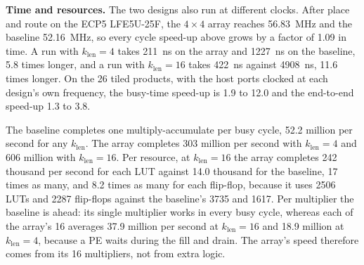 \textbf{Time and resources.} The two designs also run at different clocks. After place and route on the ECP5 LFE5U-25F, the $4 \times 4$ array reaches 56.83~MHz and the baseline 52.16~MHz, so every cycle speed-up above grows by a factor of 1.09 in time. A run with $k_{\mathrm{len}} = 4$ takes 211~ns on the array and 1227~ns on the baseline, 5.8 times longer, and a run with $k_{\mathrm{len}} = 16$ takes 422~ns against 4908~ns, 11.6 times longer. On the 26 tiled products, with the host ports clocked at each design's own frequency, the busy-time speed-up is 1.9 to 12.0 and the end-to-end speed-up 1.3 to 3.8.

The baseline completes one multiply-accumulate per busy cycle, 52.2 million per second for any $k_{\mathrm{len}}$. The array completes 303 million per second with $k_{\mathrm{len}} = 4$ and 606 million with $k_{\mathrm{len}} = 16$. Per resource, at $k_{\mathrm{len}} = 16$ the array completes 242 thousand per second for each LUT against 14.0 thousand for the baseline, 17 times as many, and 8.2 times as many for each flip-flop, because it uses 2506 LUTs and 2287 flip-flops against the baseline's 3735 and 1617. Per multiplier the baseline is ahead: its single multiplier works in every busy cycle, whereas each of the array's 16 averages 37.9 million per second at $k_{\mathrm{len}} = 16$ and 18.9 million at $k_{\mathrm{len}} = 4$, because a PE waits during the fill and drain. The array's speed therefore comes from its 16 multipliers, not from extra logic.
